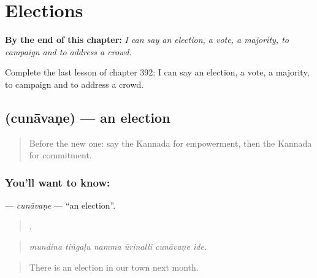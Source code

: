 
\chapter{Elections}
\label{ch:ka-elections}

\begin{chapteropening}
\textbf{By the end of this chapter:} \emph{I can say an election, a vote, a majority, to campaign and to address a crowd.}

Complete the last lesson of chapter 392: I can say an election, a vote, a majority, to campaign and to address a crowd.
\end{chapteropening}

\section[\texorpdfstring{\kn{ಚುನಾವಣೆ} (cunāvaṇe)}{ಚುನಾವಣೆ (cunāvaṇe)}]{ (cunāvaṇe) — an election}

\label{lesson:KA-C392-cunavane}



\begin{quote}
Before the new one: say the Kannada for empowerment, then the Kannada for commitment.
\end{quote}

\subsection*{You'll want to know: }
\textbf{} — \emph{cunāvaṇe} — \textquotedblleft{}an election\textquotedblright{}.

\begin{quote}
     .
\end{quote}

\begin{quote}
\emph{mundina tiṅgaḷu namma ūrinalli cunāvaṇe ide.}
\end{quote}

\begin{quote}
There is an election in our town next month.
\end{quote}

